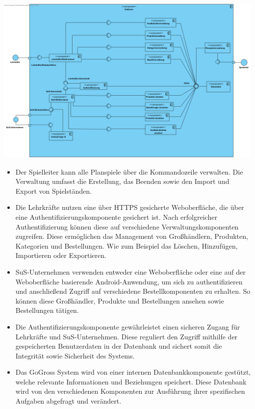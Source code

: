 \includegraphics[width=\textwidth]{img/Component}
\label{fig: GoGross Komponentendiagramm}

\begin{itemize}
    \item Der Spielleiter kann alle Planspiele über die Kommandozeile verwalten. Die Verwaltung umfasst die Erstellung, das Beenden sowie den Import und Export von Spielständen.
    \item Die Lehrkräfte nutzen eine über HTTPS gesicherte Weboberfläche, die über eine Authentifizierungskomponente gesichert ist. Nach erfolgreicher Authentifizierung können diese auf verschiedene Verwaltungskomponenten zugreifen. Diese ermöglichen das Management von Großhändlern, Produkten, Kategorien und Bestellungen. Wie zum Beispiel das Löschen, Hinzufügen, Importieren oder Exportieren.
\newpage
    \item SuS-Unternehmen verwenden entweder eine Weboberfläche oder eine auf der Weboberfläche basierende Android-Anwendung, um sich zu authentifizieren und anschließend Zugriff auf verschiedene Bestellkomponenten zu erhalten. So können diese Großhändler, Produkte und Bestellungen ansehen sowie Bestellungen tätigen. 
    \item Die Authentifizierungskomponente gewährleistet einen sicheren Zugang für Lehrkräfte und SuS-Unternehmen. Diese reguliert den Zugriff mithilfe der gespeicherten Benutzerdaten in der Datenbank und sichert somit die Integrität sowie Sicherheit des Systems.
    \item Das GoGross System wird von einer internen Datenbankkomponente gestützt, welche relevante Informationen und Beziehungen speichert. Diese Datenbank wird von den verschiedenen Komponenten zur Ausführung ihrer spezifischen Aufgaben abgefragt und verändert. 
\end{itemize}